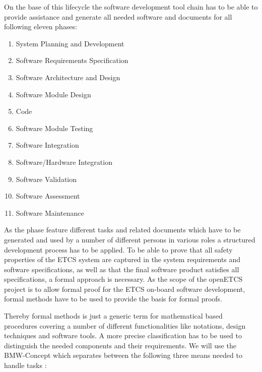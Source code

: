 \documentclass{./template/openetcs_report}
\begin{document}
On the base of this lifecycle the software development tool chain has to be able to provide assistance and generate all needed software and documents for all following eleven phases:

\vspace{-10pt}
\begin{enumerate} [topsep=2pt, partopsep=2pt,itemsep=2pt,parsep=2pt]
  \item System Planning and Development
  \item Software Requirements Specification
  \item Software Architecture and Design
  \item Software Module Design
  \item Code
  \item Software Module Testing
  \item Software Integration
  \item Software/Hardware Integration
  \item Software Validation
  \item Software Assessment
  \item Software Maintenance
\end{enumerate}

As the phase feature different tasks and related documents which have to be generated and used by a number of different persons in various roles a structured development process has to be applied. To be able to prove that all safety properties of the ETCS system are captured in the system requirements and software specifications, as well as that the final software product satisfies all specifications, a formal approach is necessary. As the scope of the openETCS project is to allow formal proof for the ETCS on-board software development, formal methods have to be used to provide the basis for formal proofs. 

Thereby formal methods is just a generic term for mathematical based procedures covering a number of different functionalities like notations, design techniques and software tools.  A more precise classification has to be used to distinguish the needed components and their requirements. We will use the BMW-Concept which separates between the following three means needed to handle tasks \citep{Schnieder.1999}:
\end{document}
